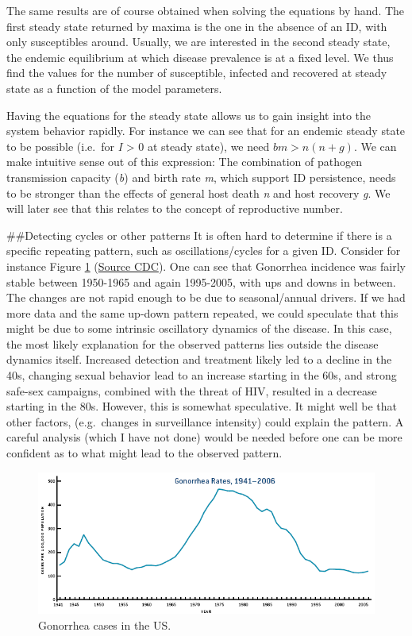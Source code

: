 \documentclass[]{book}
\theoremstyle{definition}
\theoremstyle{definition}
\theoremstyle{definition}
\theoremstyle{remark}
\begin{document}
The same results are of course obtained when solving the equations by
hand. The first steady state returned by maxima is the one in the
absence of an ID, with only susceptibles around. Usually, we are
interested in the second steady state, the endemic equilibrium at which
disease prevalence is at a fixed level. We thus find the values for the
number of susceptible, infected and recovered at steady state as a
function of the model parameters.

Having the equations for the steady state allows us to gain insight into
the system behavior rapidly. For instance we can see that for an endemic
steady state to be possible (i.e.~for \emph{I} \textgreater{} 0 at
steady state), we need \(b m > n (n+ g)\). We can make intuitive sense
out of this expression: The combination of pathogen transmission
capacity (\emph{b}) and birth rate \emph{m}, which support ID
persistence, needs to be stronger than the effects of general host death
\emph{n} and host recovery \emph{g}. We will later see that this relates
to the concept of reproductive number.

\#\#Detecting cycles or other patterns It is often hard to determine if
there is a specific repeating pattern, such as oscillations/cycles for a
given ID. Consider for instance Figure \ref{fig:gonorrheapattern}
(\href{http://www.cdc.gov/STD/stats06/images/trends-img-2.gif}{Source
CDC}). One can see that Gonorrhea incidence was fairly stable between
1950-1965 and again 1995-2005, with ups and downs in between. The
changes are not rapid enough to be due to seasonal/annual drivers. If we
had more data and the same up-down pattern repeated, we could speculate
that this might be due to some intrinsic oscillatory dynamics of the
disease. In this case, the most likely explanation for the observed
patterns lies outside the disease dynamics itself. Increased detection
and treatment likely led to a decline in the 40s, changing sexual
behavior lead to an increase starting in the 60s, and strong safe-sex
campaigns, combined with the threat of HIV, resulted in a decrease
starting in the 80s. However, this is somewhat speculative. It might
well be that other factors, (e.g.~changes in surveillance intensity)
could explain the pattern. A careful analysis (which I have not done)
would be needed before one can be more confident as to what might lead
to the observed pattern.

\begin{figure}
\centering
\includegraphics{./images/gonorrhea.png}
\caption{\label{fig:gonorrheapattern}Gonorrhea cases in the US.}
\end{figure}
\end{document}
